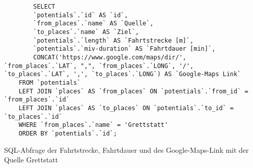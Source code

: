 \begin{listing}[htbp]
    \begin{verbatim}
        SELECT 
        `potentials`.`id` AS `id`, 
        `from_places`.`name` AS `Quelle`,
        `to_places`.`name` AS `Ziel`, 
        `potentials`.`length` AS `Fahrtstrecke [m]`, 
        `potentials`.`miv-duration` AS `Fahrtdauer [min]`,
        CONCAT('https://www.google.com/maps/dir/', `from_places`.`LAT`, ",", `from_places`.`LONG`, '/', `to_places`.`LAT`, ',', `to_places`.`LONG`) AS `Google-Maps Link`
    FROM `potentials`
    LEFT JOIN `places` AS `from_places` ON `potentials`.`from_id` = `from_places`.`id`
    LEFT JOIN `places` AS `to_places` ON `potentials`.`to_id` = `to_places`.`id`
    WHERE `from_places`.`name` = 'Grettstatt'
    ORDER BY `potentials`.`id`;
    \end{verbatim}
    \caption{SQL-Abfrage der Fahrtstrecke, Fahrtdauer und des Google-Maps-Link mit der Quelle Grettstatt}\label{lst-f-grettstatt}
\end{listing}